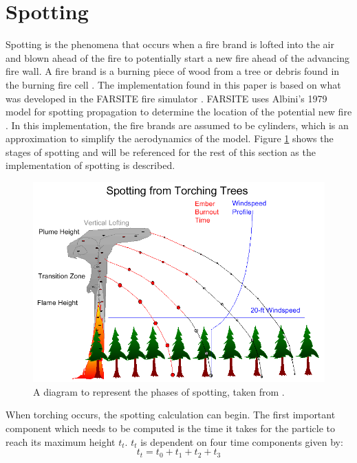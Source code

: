 \section{Spotting}
Spotting is the phenomena that occurs when a fire brand is lofted into the air and blown ahead of the fire to potentially start a new fire ahead of the advancing fire wall. A fire brand is a burning piece of wood from a tree or debris found in the burning fire cell \cite{firereview}. The implementation found in this paper is based on what was developed in the FARSITE fire simulator \cite{FARSITE}. FARSITE uses Albini's 1979 model for spotting propagation to determine the location of the potential new fire \cite{albini}. In this implementation, the fire brands are assumed to be cylinders, which is an approximation to simplify the aerodynamics of the model. Figure \ref{fig:spot_diagram} shows the stages of spotting and will be referenced for the rest of this section as the implementation of spotting is described. 
\begin{figure}%
\centering
  \includegraphics[width=\textwidth]{figures/implementation/spotting_diagram.png}
  \caption{A diagram to represent the phases of spotting, taken from \cite{firebehaveref}.}
  \label{fig:spot_diagram}
\end{figure}

When torching occurs, the spotting calculation can begin. The first important component which needs to be computed is the time it takes for the particle to reach its maximum height $t_t$. $t_t$ is dependent on four time components given by: 
\begin{equation}
t_t = t_0 + t_1 + t_2 + t_3
\end{equation}

